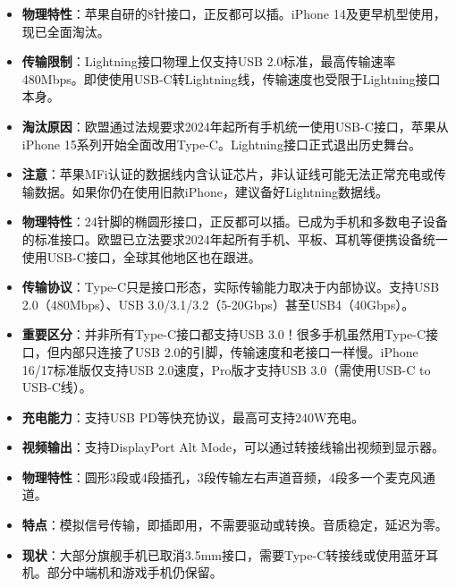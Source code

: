 
\begin{itemize}
  \item \textbf{物理特性}：苹果自研的8针接口，正反都可以插。iPhone 14及更早机型使用，现已全面淘汰。
  \item \textbf{传输限制}：Lightning接口物理上仅支持USB 2.0标准，最高传输速率480Mbps。即使使用USB-C转Lightning线，传输速度也受限于Lightning接口本身。
  \item \textbf{淘汰原因}：欧盟通过法规要求2024年起所有手机统一使用USB-C接口，苹果从iPhone 15系列开始全面改用Type-C。Lightning接口正式退出历史舞台。
  \item \textbf{注意}：苹果MFi认证的数据线内含认证芯片，非认证线可能无法正常充电或传输数据。如果你仍在使用旧款iPhone，建议备好Lightning数据线。
\end{itemize}


\begin{itemize}
  \item \textbf{物理特性}：24针脚的椭圆形接口，正反都可以插。已成为手机和多数电子设备的标准接口。欧盟已立法要求2024年起所有手机、平板、耳机等便携设备统一使用USB-C接口，全球其他地区也在跟进。
  \item \textbf{传输协议}：Type-C只是接口形态，实际传输能力取决于内部协议。支持USB 2.0（480Mbps）、USB 3.0/3.1/3.2（5-20Gbps）甚至USB4（40Gbps）。
  \item \textbf{重要区分}：并非所有Type-C接口都支持USB 3.0！很多手机虽然用Type-C接口，但内部只连接了USB 2.0的引脚，传输速度和老接口一样慢。iPhone 16/17标准版仅支持USB 2.0速度，Pro版才支持USB 3.0（需使用USB-C to USB-C线）。
  \item \textbf{充电能力}：支持USB PD等快充协议，最高可支持240W充电。
  \item \textbf{视频输出}：支持DisplayPort Alt Mode，可以通过转接线输出视频到显示器。
\end{itemize}


\begin{itemize}
  \item \textbf{物理特性}：圆形3段或4段插孔，3段传输左右声道音频，4段多一个麦克风通道。
  \item \textbf{特点}：模拟信号传输，即插即用，不需要驱动或转换。音质稳定，延迟为零。
  \item \textbf{现状}：大部分旗舰手机已取消3.5mm接口，需要Type-C转接线或使用蓝牙耳机。部分中端机和游戏手机仍保留。
\end{itemize}

